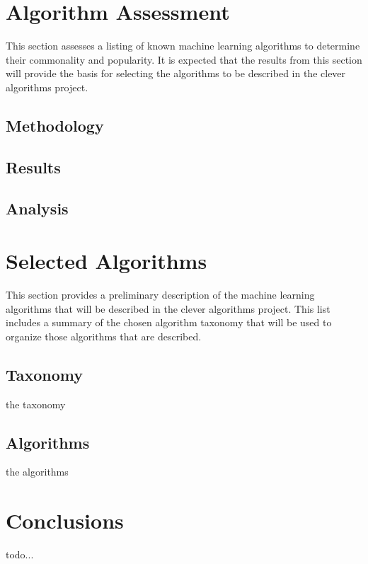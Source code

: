 \documentclass[a4paper, 11pt]{article}
\begin{document}
%
%
\section{Algorithm Assessment}
\label{sec:assessment}
This section assesses a listing of known machine learning algorithms to determine their commonality and popularity. It is expected that the results from this section will provide the basis for selecting the algorithms to be described in the clever algorithms project.

\subsection{Methodology}

\subsection{Results}

\subsection{Analysis}



%
%
\section{Selected Algorithms}
\label{sec:selected}
This section provides a preliminary description of the machine learning algorithms that will be described in the clever algorithms project. This list includes a summary of the chosen algorithm taxonomy that will be used to organize those algorithms that are described. 

\subsection{Taxonomy}
the taxonomy


\subsection{Algorithms}
the algorithms



%
%
\section{Conclusions}
\label{sec:conclusions}
todo...
\end{document}
